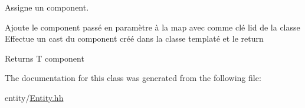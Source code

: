 Assigne un component. 

Ajoute le component passé en paramètre à la map avec comme clé l\textquotesingle{}id de la classe Effectue un cast du component créé dans la classe templaté et le return \begin{DoxyReturn}{Returns}
T component 
\end{DoxyReturn}


The documentation for this class was generated from the following file\+:\begin{DoxyCompactItemize}
\item 
entity/\hyperlink{_entity_8hh}{Entity.\+hh}\end{DoxyCompactItemize}
